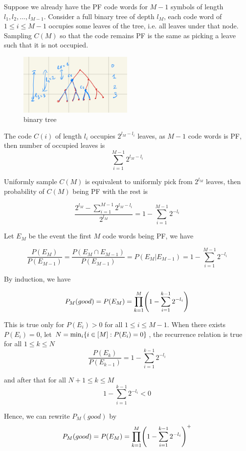 \documentclass{article}
\begin{document}
Suppose we already have the PF code words for $M-1$ symbols of length $l_1, l_2, ..., l_{M-1}$. Consider a full binary tree of depth $l_M$, each code word of $1 \leq i \leq M-1$ occupies some leaves of the tree, i.e. all leaves under that node. Sampling $C(M)$ so that the code remains PF is the same as picking a leave such that it is not occupied.

\begin{figure}[h]
\centering
\includegraphics[width=0.5\textwidth]{btree.jpg}
\caption{binary tree}
\label{fig_btree}
\end{figure}

The code $C(i)$ of length $l_i$ occupies $2^{l_M - l_i}$ leaves, as $M-1$ code words is PF, then number of occupied leaves is
$$
    \sum_{i=1}^{M-1} 2^{l_M - l_i}
$$

Uniformly sample $C(M)$ is equivalent to uniformly pick from $2^{l_M}$ leaves, then probability of $C(M)$ being PF with the rest is

$$
    \frac{2^{l_M} - \sum_{i=1}^{M-1} 2^{l_M - l_i}}{2^{l_M}}  = 1 - \sum_{i = 1}^{M-1} 2^{-l_i}
$$

Let $E_M$ be the event the first $M$ code words being PF, we have

$$
    \frac{P(E_M)}{P(E_{M-1})} = \frac{P(E_M \cap E_{M-1})}{P(E_{M-1})} = P(E_M | E_{M-1}) = 1 - \sum_{i = 1}^{M-1} 2^{-l_i}
$$

By induction, we have

$$
    P_M(good) = P(E_M) = \prod_{k=1}^M \tuple*{1 - \sum_{i = 1}^{k-1} 2^{-l_i}}
$$

This is true only for $P(E_i) > 0$ for all $1 \leq i \leq M-1$. When there exists $P(E_i) = 0$, let $N = \min_i \{i \in [M]: P(E_i) = 0\}$, the recurrence relation is true for all $1 \leq k \leq N$
$$
    \frac{P(E_k)}{P(E_{k-1})} = 1 - \sum_{i = 1}^{k-1} 2^{-l_i}
$$

and after that for all $N+1 \leq k \leq M$
$$
    1 - \sum_{i = 1}^{k-1} 2^{-l_i} < 0
$$

Hence, we can rewrite $P_M(good)$ by
$$
    P_M(good) = P(E_M) = \prod_{k=1}^M \tuple*{1 - \sum_{i = 1}^{k-1} 2^{-l_i}}^+
$$
\end{document}
